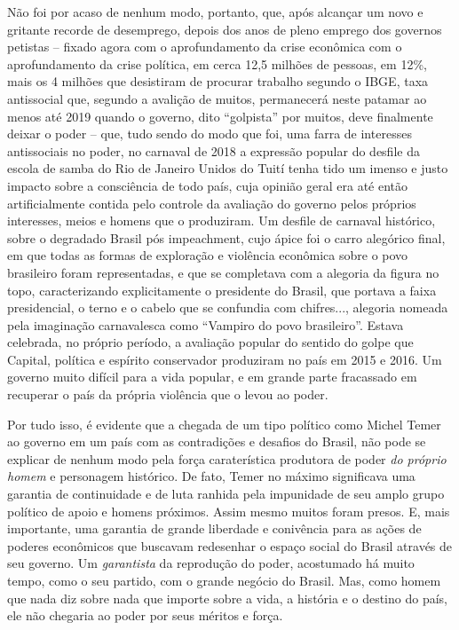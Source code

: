 Não foi por acaso de nenhum modo, portanto, que, após alcançar um novo e
gritante recorde de desemprego, depois dos anos de pleno emprego dos
governos petistas -- fixado agora com o aprofundamento da crise
econômica com o aprofundamento da crise política, em cerca 12,5 milhões
de pessoas, em 12\%, mais os 4 milhões que desistiram de procurar
trabalho segundo o IBGE, taxa antissocial que, segundo a avalição de
muitos, permanecerá neste patamar ao menos até 2019 quando o governo,
dito ``golpista'' por muitos, deve finalmente deixar o poder -- que,
tudo sendo do modo que foi, uma farra de interesses antissociais no
poder, no carnaval de 2018 a expressão popular do desfile da escola de
samba do Rio de Janeiro Unidos do Tuití tenha tido um imenso e justo
impacto sobre a consciência de todo país, cuja opinião geral era até
então artificialmente contida pelo controle da avaliação do governo
pelos próprios interesses, meios e homens que o produziram. Um desfile
de carnaval histórico, sobre o degradado Brasil pós impeachment, cujo
ápice foi o carro alegórico final, em que todas as formas de exploração
e violência econômica sobre o povo brasileiro foram representadas, e que
se completava com a alegoria da figura no topo, caracterizando
explicitamente o presidente do Brasil, que portava a faixa presidencial,
o terno e o cabelo que se confundia com chifres..., alegoria nomeada
pela imaginação carnavalesca como ``Vampiro do povo brasileiro''. Estava
celebrada, no próprio período, a avaliação popular do sentido do golpe
que Capital, política e espírito conservador produziram no país em 2015
e 2016. Um governo muito difícil para a vida popular, e em grande parte
fracassado em recuperar o país da própria violência que o levou ao
poder.

Por tudo isso, é evidente que a chegada de um tipo político como Michel
Temer ao governo em um país com as contradições e desafios do Brasil,
não pode se explicar de nenhum modo pela força caraterística produtora
de poder \emph{do próprio homem} e personagem histórico. De fato, Temer
no máximo significava uma garantia de continuidade e de luta ranhida
pela impunidade de seu amplo grupo político de apoio e homens próximos.
Assim mesmo muitos foram presos. E, mais importante, uma garantia de
grande liberdade e conivência para as ações de poderes econômicos que
buscavam redesenhar o espaço social do Brasil através de seu governo. Um
\emph{garantista} da reprodução do poder, acostumado há muito tempo,
como o seu partido, com o grande negócio do Brasil. Mas, como homem que
nada diz sobre nada que importe sobre a vida, a história e o destino do
país, ele não chegaria ao poder por seus méritos e força.

